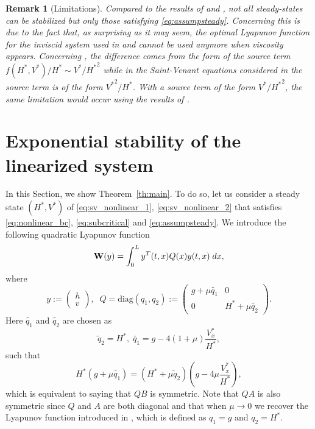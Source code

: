 \documentclass[11pt]{article}
\newtheorem{rmk}{Remark}[section]
\begin{document}
\begin{rmk}[{Limitations}] \label{rmk:limitations}
Compared to the results of {\cite{bastin2017quadratic}}
and \cite{hayat2019quadratic}, not all steady-states can be stabilized but only those satisfying 
\eqref{eq:assumpsteady}. Concerning \cite{hayat2019quadratic} this is due to the fact that, as surprising as it may seem, the optimal Lyapunov function for the inviscid system used in \cite{hayat2019quadratic} and \cite{hayat2021exponential} cannot be used anymore when viscosity appears. Concerning \cite{bastin2017quadratic}, the difference comes from the form of the source term $f(H^{*},V^{*})/H^{*} \sim  V^{*}/{H^{*}}^{2}$ while in the Saint-Venant equations considered in \cite{bastin2017quadratic} the source term is of the form ${V^{*}}^{2}/H^{*}$. With a source term of the form ${V^{*}/{H^{*}}^{2}}$, the same 
limitation would occur using the results of \cite{bastin2017quadratic}.
\end{rmk}


\section{Exponential stability of the linearized system}
\label{sec:exp_stab}

In this Section, we show Theorem~\ref{th:main}. To do so, let us consider a steady state $(H^*,V^*)$ of \eqref{eq:sv_nonlinear_1}, \eqref{eq:sv_nonlinear_2} that satisfies \eqref{eq:nonlinear_bc}, \eqref{eq:subcritical} and \eqref{eq:assumpsteady}. We introduce the following quadratic Lyapunov function
\begin{equation}
    {\bf {W}}(y) = \int_0^L y^T{(t,x)}Q(x)y{(t,x)} \; dx,
    \label{eq:lyap_fn}
\end{equation}
where 
\begin{equation}
\label{eq:defQ}
    y := \begin{pmatrix} h \\ v \end{pmatrix},\;\; Q =\text{diag}(q_{1},q_{2}):= \begin{pmatrix} g + \mu \widetilde{q_1} & 0 \\ 0 &H^{*} + \mu \widetilde{q_2}\end{pmatrix}.
\end{equation}
{Here} $\widetilde{q_1}$ and $\widetilde{q_2}$ are chosen as
\begin{equation}
\label{eq:defq1q20}
\widetilde{q}_{2} = H^{*},\; \widetilde{q_{1}} = g -4 (1+\mu)\frac{V_{x}^{*}}{H^{*}},
\end{equation}
such that 
\begin{equation}
\label{eq:defq1q2}
H^{*} (g+\mu\widetilde{q_1}) = (H^{*}+\mu\tilde{q}_{2})\left(g - 4 \mu \frac{V^{*}_x}{H^{*}}\right),
\end{equation}
which is equivalent to saying that $QB$ is symmetric.
Note that $QA$ is also symmetric since $Q$ and $A$ are both diagonal and that when $\mu \rightarrow 0$ we recover the Lyapunov function introduced {in \cite[Equation (17)]{bastin2017quadratic}, which is defined as $q_1 = g$ and $q_2 = H^*$.}
\end{document}
